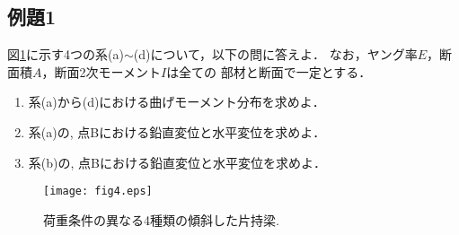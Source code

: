 \documentclass[10pt,a4j]{jarticle}
\begin{document}
\subsection{例題1}
図\ref{fig:fig4}に示す4つの系(a)$\sim$(d)について，以下の問に答えよ．
なお，ヤング率$E$，断面積$A$，断面2次モーメント$I$は全ての
部材と断面で一定とする．
\begin{enumerate}
\item
	系(a)から(d)における曲げモーメント分布を求めよ．
\item
	系(a)の, 点Bにおける鉛直変位と水平変位を求めよ．
\item
	系(b)の, 点Bにおける鉛直変位と水平変位を求めよ．
\end{enumerate}
\begin{figure}[h]
	\begin{center}
	\texttt{[image: fig4.eps]} 
	\end{center}
	\caption{荷重条件の異なる4種類の傾斜した片持梁.} 
	\label{fig:fig4}
\end{figure}
\end{document}
